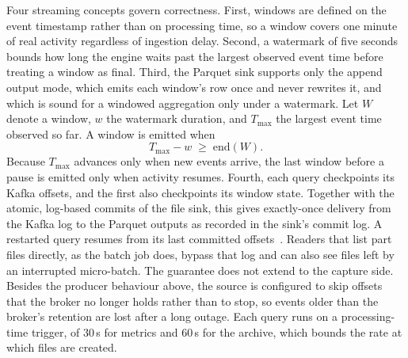 \documentclass[sensors,article,submit,pdftex,oneauthor]{Definitions/mdpi}
\begin{document}
Four streaming concepts govern correctness. First, windows are defined on the event timestamp rather than on processing time, so a window covers one minute of real activity regardless of ingestion delay. Second, a watermark of five seconds bounds how long the engine waits past the largest observed event time before treating a window as final. Third, the Parquet sink supports only the append output mode, which emits each window's row once and never rewrites it, and which is sound for a windowed aggregation only under a watermark. Let $W$ denote a window, $w$ the watermark duration, and $T_{\max}$ the largest event time observed so far. A window is emitted when
\begin{equation}
T_{\max} - w \;\geq\; \text{end}(W).
\label{eq:emit}
\end{equation}
Because $T_{\max}$ advances only when new events arrive, the last window before a pause is emitted only when activity resumes. Fourth, each query checkpoints its Kafka offsets, and the first also checkpoints its window state. Together with the atomic, log-based commits of the file sink, this gives exactly-once delivery from the Kafka log to the Parquet outputs as recorded in the sink's commit log. A restarted query resumes from its last committed offsets~\cite{armbrust2018structured}. Readers that list part files directly, as the batch job does, bypass that log and can also see files left by an interrupted micro-batch. The guarantee does not extend to the capture side. Besides the producer behaviour above, the source is configured to skip offsets that the broker no longer holds rather than to stop, so events older than the broker's retention are lost after a long outage. Each query runs on a processing-time trigger, of 30\,s for metrics and 60\,s for the archive, which bounds the rate at which files are created.
\end{document}
